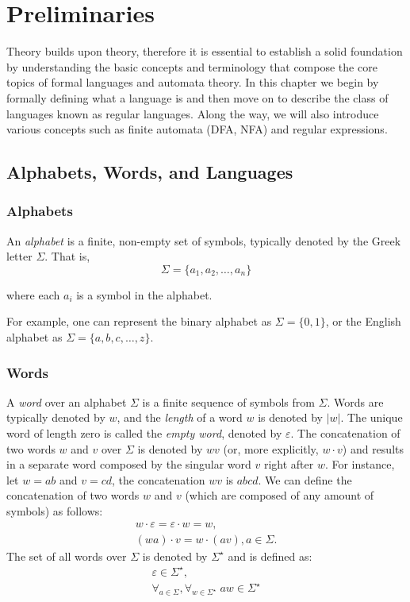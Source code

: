 \chapter{Preliminaries}\label{chap:prelim}
Theory builds upon theory, therefore it is essential to establish a solid foundation by understanding the basic concepts and terminology that compose the core topics of formal languages and automata theory.
In this chapter we begin by formally defining what a language is and then move on to describe the class of languages known as regular languages.
Along the way, we will also introduce various concepts such as finite automata (DFA, NFA) and regular expressions.

\section{Alphabets, Words, and Languages}
\subsection*{Alphabets}

An \emph{alphabet} is a finite, non-empty set of symbols, typically denoted by the Greek letter $\Sigma$. That is,
\[
\Sigma = \{ a_1, a_2, \dots, a_n \}
\]

\noindent where each $a_i$ is a symbol in the alphabet.

For example, one can represent the binary alphabet as $\Sigma = \{ 0, 1 \}$, or the English alphabet as $\Sigma = \{ a, b, c, \ldots, z \}$.

\subsection*{Words}

A \emph{word} over an alphabet $\Sigma$ is a finite sequence of symbols from $\Sigma$. Words are typically denoted by $w$, and the \emph{length} of a word $w$ is denoted by $|w|$.
The unique word of length zero is called the \emph{empty word}, denoted by $\varepsilon$.
The concatenation of two words $w$ and $v$ over $\Sigma$ is denoted by $wv$ (or, more explicitly, $w \cdot v$) and results in a separate word composed by the singular word $v$ right after $w$. For instance, let $w = ab$ and $v = cd$, the concatenation $wv$ is $abcd$. We can define the concatenation of two words $w$ and $v$ (which are composed of any amount of symbols) as follows: %
\begin{gather*}
	w \cdot \varepsilon = \varepsilon \cdot w = w, \\
	(wa) \cdot v = w \cdot (av), a \in \Sigma.
\end{gather*}
The set of all words over $\Sigma$ is denoted by $\Sigma^{\star}$ and is defined as:
\begin{gather*}
	\varepsilon \in \Sigma^\star, \\
	\forall_{a \in \Sigma}, \forall_{w \in \Sigma^{\star}} \; aw \in \Sigma^\star
\end{gather*}

